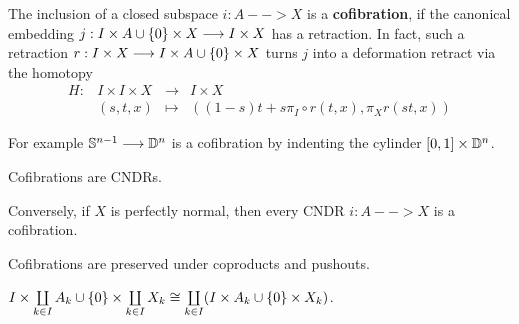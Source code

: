 	\begin{definition}
		The inclusion of a closed subspace $i:A --> X$ is a \textbf{cofibration}, if the canonical embedding $j:I \times A \cup \{0\} \times X --> I \times X$ has a retraction. In fact, such a retraction $r: I \times X --> I \times A \cup \{0\} \times X$ turns $j$ into a deformation retract via the  homotopy
		\begin{equation*}
			\begin{array}{rccl}
				H: &I \times I \times X &\longrightarrow & I \times X\\
				&(s,t,x)&\longmapsto& ((1-s)t + s\pi_I\circ r(t,x), \pi_Xr(st,x))
			\end{array}
		\end{equation*}
	\end{definition}

	For example $\mathbb{S}^{n-1} --> \mathbb{D}^n$ is a cofibration {by indenting the cylinder $[0,1] \times \mathbb{D}^n$}.

	\begin{proposition}
		Cofibrations are CNDRs.

		Conversely, if $X$ is perfectly normal, then every CNDR $i:A-->X$ is a cofibration.

	\end{proposition}

	\begin{lemma}
		Cofibrations are preserved under coproducts and pushouts.
	\end{lemma}
	\begin{sketch}

		$I \times \coprod \limits_{k \in I} A_k \cup \{0\} \times \coprod \limits_{k \in I} X_k \cong \coprod \limits_{k \in I} (I \times A_k \cup \{0\} \times X_k)$.
	\end{sketch}


